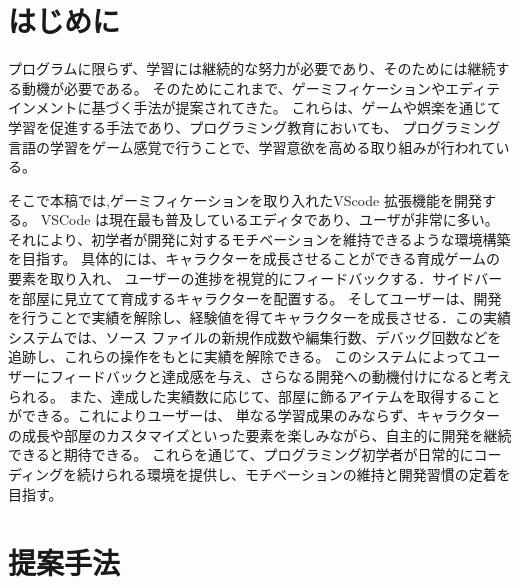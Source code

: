 \documentclass[12pt,twoside]{jbook}
\begin{document}

\tableofcontents       %

%
%

\listoffigures         %
\listoftables          %


%
%
\chapter{はじめに}

 プログラムに限らず、学習には継続的な努力が必要であり、そのためには継続する動機が必要である。
そのためにこれまで、ゲーミフィケーション\cite{2022caeai_zhan}やエディテインメント\cite{2020ipsj_hanayama}に基づく手法が提案されてきた。
これらは、ゲームや娯楽を通じて学習を促進する手法であり、プログラミング教育においても、
プログラミング言語の学習をゲーム感覚で行うことで、学習意欲を高める取り組みが行われている\cite{2014hicss_hamari}。

 そこで本稿では,ゲーミフィケーションを取り入れたVScode 拡張機能を開発する。
VSCode は現在最も普及しているエディタであり、ユーザが非常に多い。
それにより、初学者が開発に対するモチベーションを維持できるような環境構築を目指す。
具体的には、キャラクターを成長させることができる育成ゲームの要素を取り入れ、
ユーザーの進捗を視覚的にフィードバックする．サイドバーを部屋に見立てて育成するキャラクターを配置する。
そしてユーザーは、開発を行うことで実績を解除し、経験値を得てキャラクターを成長させる．この実績システムでは、ソース
ファイルの新規作成数や編集行数、デバッグ回数などを追跡し、これらの操作をもとに実績を解除できる。
このシステムによってユーザーにフィードバックと達成感を与え、さらなる開発への動機付けになると考えられる。
また、達成した実績数に応じて、部屋に飾るアイテムを取得することができる。これによりユーザーは、
単なる学習成果のみならず、キャラクターの成長や部屋のカスタマイズといった要素を楽しみながら、自主的に開発を継続できると期待できる。
これらを通じて、プログラミング初学者が日常的にコーディングを続けられる環境を提供し、モチベーションの維持と開発習慣の定着を目指す。

\chapter{提案手法} \label{sec:proposal}
\end{document}

